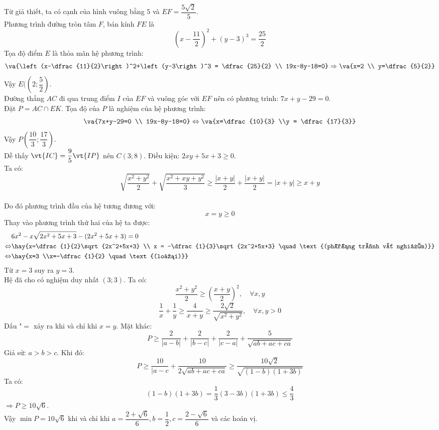 Từ giả thiết, ta có cạnh của hình vuông bằng $5$ và $EF=\dfrac{5\sqrt{2}}{5}$.\\
Phương trình đường tròn tâm $F$, bán kính $FE$ là
$$\left(x-\dfrac{11}{2}\right)^2+\left(y-3\right)^3 = \dfrac{25}{2}$$
Tọa độ điểm $E$ là thỏa mãn hệ phương trình:
$$\va{\left(x-\dfrac{11}{2}\right)^2+\left(y-3\right)^3 = \dfrac{25}{2} \\ 19x-8y-18=0} \Rightarrow \va{x=2 \\ y=\dfrac{5}{2}}$$
Vậy $E(\left(2;\dfrac{5}{2}\right)$.\\
Đường thẳng $AC$ đi qua trung điểm $I$ của $EF$ và vuông góc với $EF$ nên có phương trình: $7x+y-29=0$.\\
Đặt $P = AC \cap EK$. Tọa độ của $P$ là nghiệm của hệ phương trình:
$$\va{7x+y-29=0 \\ 19x-8y-18=0} \Leftrightarrow \va{x=\dfrac{10}{3} \\y = \dfrac{17}{3}}$$
Vậy $P \left(\dfrac{10}{3};\dfrac{17}{3}\right)$.\\
Dễ thấy $\vt{IC}=\dfrac{9}{5}\vt{IP}$ nên $C(3;8)$.
\lgi
Điều kiện: $2xy+5x+3 \geq 0$. \\
Ta có:
$$\sqrt{\dfrac{x^2+y^2}{2}}+\sqrt{\dfrac{x^2+xy+y^2}{3}} \geq \dfrac{|x+y|}{2}+\dfrac{|x+y|}{2} = |x+y| \geq x+y$$
\\
Do đó phương trình đầu của hệ tương đương với:
$$x=y\geq 0$$
Thay vào phương trình thứ hai của hệ ta được:
\begin{align*}
& 6x^2-x\sqrt{2x^2+5x+3}-(2x^2+5x+3)=0 \\
\Leftrightarrow & \hay{x=\dfrac{1}{2}\sqrt{2x^2+5x+3} \\ x = -\dfrac{1}{3}\sqrt{2x^2+5x+3} \quad \text{(phương trình vô nghiệm)}} \\
\Leftrightarrow & \hay{x=3 \\x=-\dfrac{1}{2} \quad \text{(loại)}}
\end{align*} 
Từ $x=3$ suy ra $y=3$. \\
Hệ đã cho có nghiệm duy nhất $(3;3)$.
\lgi
Ta có:
$$\dfrac{x^2+y^2}{2}\geq \left(\dfrac{x+y}{2}\right)^2, \quad \forall x, y$$
$$\dfrac{1}{x}+\dfrac{1}{y} \geq \dfrac{4}{x+y} \geq \dfrac{2\sqrt{2}}{\sqrt{x^2+y^2}}, \quad \forall x, y > 0$$
Dấu "$=$ xảy ra khi và chỉ khi $x=y$.
Mặt khác:
$$P \geq \dfrac{2}{|a-b|}+\dfrac{2}{|b-c|}+\dfrac{2}{|c-a|}+\dfrac{5}{\sqrt{ab+ac+ca}}$$
Giả sử: $a>b>c$. Khi đó:
$$P \geq \dfrac{10}{|a-c}+\dfrac{10}{2\sqrt{ab+ac+ca}} \geq \dfrac{10\sqrt{2}}{\sqrt{(1-b)(1+3b)}}$$
Ta có:
$$(1-b)(1+3b)=\dfrac{1}{3}(3-3b)(1+3b) \leq \dfrac{4}{3}$$
$\Rightarrow P \geq 10\sqrt{6}$.\\
Vậy $\min P = 10\sqrt{6}$ khi và chỉ khi $a=\dfrac{2+\sqrt{6}}{6}, b=\dfrac{1}{2}, c=\dfrac{2-\sqrt{6}}{6}$ và các hoán vị.
